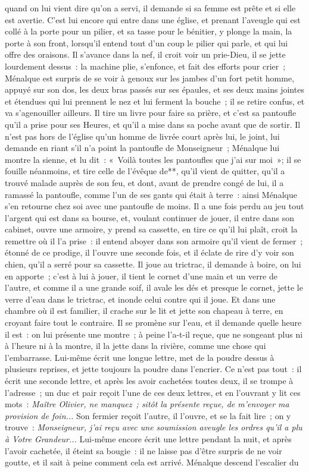 \documentclass[french,twoside]{book} %
\begin{document}
quand on lui vient dire qu’on a servi, il demande si sa femme est prête et si elle est avertie. C'est lui encore qui entre dans une église, et prenant l’aveugle qui est collé à la porte pour un pilier, et sa tasse pour le bénitier, y plonge la main, la porte à son front, lorsqu’il entend tout d’un coup le pilier qui parle, et qui lui offre des oraisons. Il s’avance dans la nef, il croit voir un prie-Dieu, il se jette lourdement dessus : la machine plie, s’enfonce, et fait des efforts pour crier ; Ménalque est surpris de se voir à genoux sur les jambes d’un fort petit homme, appuyé sur son dos, les deux bras passés sur ses épaules, et ses deux mains jointes et étendues qui lui prennent le nez et lui ferment la bouche ; il se retire confus, et va s’agenouiller ailleurs. Il tire un livre pour faire sa prière, et c’est sa pantoufle qu’il a prise pour ses Heures, et qu’il a mise dans sa poche avant que de sortir. Il n’est pas hors de l’église qu’un homme de livrée court après lui, le joint, lui demande en riant s’il n’a point la pantoufle de Monseigneur ; Ménalque lui montre la sienne, et lu dit : « Voilà toutes les pantoufles que j’ai sur moi »; il se fouille néanmoins, et tire celle de l’évêque de**, qu’il vient de quitter, qu’il a trouvé malade auprès de son feu, et dont, avant de prendre congé de lui, il a ramassé la pantoufle, comme l’un de ses gants qui était à terre : ainsi Ménalque s’en retourne chez soi avec une pantoufle de moins. Il a une fois perdu au jeu tout l’argent qui est dans sa bourse, et, voulant continuer de jouer, il entre dans son cabinet, ouvre une armoire, y prend sa cassette, en tire ce qu’il lui plaît, croit la remettre où il l’a prise : il entend aboyer dans son armoire qu’il vient de fermer ; étonné de ce prodige, il l’ouvre une seconde fois, et il éclate de rire d’y voir son chien, qu’il a serré pour sa cassette. Il joue au trictrac, il demande à boire, on lui en apporte ; c’est à lui à jouer, il tient le cornet d’une main et un verre de l’autre, et comme il a une grande soif, il avale les dés et presque le cornet, jette le verre d’eau dans le trictrac, et inonde celui contre qui il joue. Et dans une chambre où il est familier, il crache sur le lit et jette son chapeau à terre, en croyant faire tout le contraire. Il se promène sur l’eau, et il demande quelle heure il est : on lui présente une montre ; à peine l’a-t-il reçue, que ne songeant plus ni à l’heure ni à la montre, il la jette dans la rivière, comme une chose qui l’embarrasse. Lui-même écrit une longue lettre, met de la poudre dessus à plusieurs reprises, et jette toujours la poudre dans l’encrier. Ce n’est pas tout : il écrit une seconde lettre, et après les avoir cachetées toutes deux, il se trompe à l’adresse ; un duc et pair reçoit l’une de ces deux lettres, et en l’ouvrant y lit ces mots : {\itshape Maître Olivier, ne manquez ; sitôt la présente reçue, de m’envoyer ma provision de foin...} Son fermier reçoit l’autre, il l’ouvre, et se la fait lire ; on y trouve : {\itshape Monseigneur, j’ai reçu avec une soumission aveugle les ordres qu’il a plu à Votre Grandeur...} Lui-même encore écrit une lettre pendant la nuit, et après l’avoir cachetée, il éteint sa bougie : il ne laisse pas d’être surpris de ne voir goutte, et il sait à peine comment cela est arrivé. Ménalque descend l’escalier du 
\end{document}
